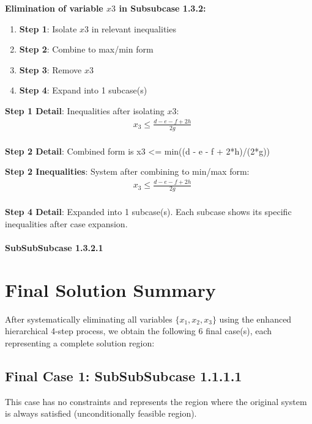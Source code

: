 \documentclass{article}
\begin{document}
\textbf{Elimination of variable $x3$ in Subsubcase 1.3.2:}

\begin{enumerate}
\item \textbf{Step 1}: Isolate $x3$ in relevant inequalities
\item \textbf{Step 2}: Combine to max/min form
\item \textbf{Step 3}: Remove $x3$
\item \textbf{Step 4}: Expand into 1 subcase(s)
\end{enumerate}

\textbf{Step 1 Detail}: Inequalities after isolating $x3$:
\begin{align}
& x_{3} \leq \frac{d - e - f + 2 h}{2 g} \\
\end{align}

\textbf{Step 2 Detail}: Combined form is x3 <= min((d - e - f + 2*h)/(2*g))

\textbf{Step 2 Inequalities}: System after combining to min/max form:
\begin{align}
& x_{3} \leq \frac{d - e - f + 2 h}{2 g} \\
\end{align}

\textbf{Step 4 Detail}: Expanded into 1 subcase(s).
Each subcase shows its specific inequalities after case expansion.

\paragraph{SubSubSubcase 1.3.2.1}

\section{Final Solution Summary}

After systematically eliminating all variables $\{x_{1}, x_{2}, x_{3}\}$
using the enhanced hierarchical 4-step process, we obtain the following
6 final case(s), each representing a complete solution region:

\subsection{Final Case 1: SubSubSubcase 1.1.1.1}

This case has no constraints and represents the region where the original
system is always satisfied (unconditionally feasible region).
\end{document}
